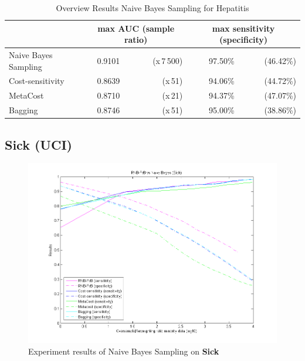 \begin{table}[h]
\centering  
\begin{tabular}{ l | c r | r r|}                                      
& \multicolumn{2}{c}{max AUC (sample ratio)} & \multicolumn{2}{c}{max sensitivity (specificity)} \\
\hline 
Naive Bayes Sampling & 0.9101 & (x\,7\,500) & 97.50\% & (46.42\%)\\
Cost-sensitivity & 0.8639 & (x\,51) & 94.06\% & (44.72\%)\\
MetaCost & 0.8710 & (x\,21) & 94.37\% & (47.07\%)\\
Bagging & 0.8746 & (x\,51) & 95.00\% & (38.86\%)\\
\hline                          %
\end{tabular}
\label{tab:PPer}
\caption{Overview Results Naive Bayes Sampling for Hepatitis} %
\end{table}

\newpage
\subsection{Sick (UCI)}
\begin{figure}[h]
\includegraphics[scale=0.65]{img/RNB-FvB-sick.png}
\caption{Experiment results of Naive Bayes Sampling on \textbf{Sick}}
\end{figure}


